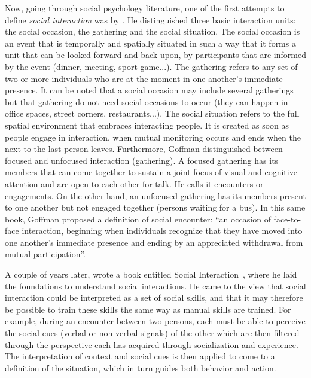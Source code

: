 \documentclass[a4paper,11pt,twoside]{StyleThese}
\begin{document}
Now, going through social psychology literature, one of the first attempts to define \emph{social interaction} was by \cite{goffman_1967_interaction}. He distinguished three basic interaction units: the social occasion, the gathering and the social situation. The social occasion is an event that is temporally and spatially situated in such a way that it forms a unit that can be looked forward and back upon, by participants that are informed by the event (dinner, meeting, sport game...). The gathering refers to any set of two or more individuals who are at the moment in one another’s immediate presence. It can be noted that a social occasion may include several gatherings but that gathering do not need social occasions to occur (they can happen in office spaces, street corners, restaurants...). The social situation refers to the full spatial environment that embraces interacting people. It is created as soon as people engage in interaction, when mutual monitoring occurs and ends when the next to the last person leaves. Furthermore, Goffman distinguished between focused and unfocused interaction (gathering). A focused gathering has its members that can come together to sustain a joint focus of visual and cognitive attention and are open to each other for talk. He calls it encounters or engagements. On the other hand, an unfocused gathering has its members present to one another but not engaged together (\eg persons waiting for a bus). In this same book, Goffman proposed a definition of social encounter: ``an occasion of face-to-face interaction, beginning when individuals recognize that they have moved into one another’s immediate presence and ending by an appreciated withdrawal from mutual participation''.

A couple of years later, \citeauthor{argyle_1973_social} wrote a book entitled Social Interaction~\citep{argyle_1973_social}, where he laid the foundations to understand social interactions. He came to the view that social interaction could be interpreted as a set of social skills, and that it may therefore be possible to train these skills the same way as manual skills are trained. For example, during an encounter between two persons, each must be able to perceive the social cues (verbal or non-verbal signals) of the other which are then filtered through the perspective each has acquired through socialization and experience. The interpretation of context and social cues is then applied to come to a definition of the situation, which in turn guides both behavior and action.
\end{document}
